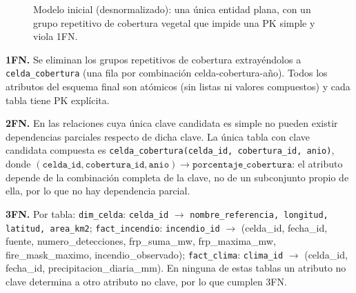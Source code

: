 \documentclass[11pt,a4paper]{article}
\begin{document}
\begin{figure}[H]
\centering
{}
\caption{Modelo inicial (desnormalizado): una \'unica entidad plana, con un grupo repetitivo de
cobertura vegetal que impide una PK simple y viola 1FN.}
\label{fig:modelo-inicial}
\end{figure}

\textbf{1FN.} Se eliminan los grupos repetitivos de cobertura extray\'endolos a
\texttt{celda\_cobertura} (una fila por combinaci\'on celda-cobertura-a\~no). Todos los atributos
del esquema final son at\'omicos (sin listas ni valores compuestos) y cada tabla tiene PK
expl\'icita.

\textbf{2FN.} En las relaciones cuya \'unica clave candidata es simple no pueden existir
dependencias parciales respecto de dicha clave. La \'unica tabla con clave candidata compuesta es
\texttt{celda\_cobertura(celda\_id, cobertura\_id, anio)}, donde
$(\texttt{celda\_id}, \texttt{cobertura\_id}, \texttt{anio}) \rightarrow
\texttt{porcentaje\_cobertura}$: el atributo depende de la combinaci\'on completa de la clave, no
de un subconjunto propio de ella, por lo que no hay dependencia parcial.

\textbf{3FN.} Por tabla: \texttt{dim\_celda}: \texttt{celda\_id} $\rightarrow$
\texttt{nombre\_referencia, longitud, latitud, area\_km2}; \texttt{fact\_incendio}:
\texttt{incendio\_id} $\rightarrow$ (celda\_id, fecha\_id, fuente, numero\_detecciones,
frp\_suma\_mw, frp\_maxima\_mw, fire\_mask\_maximo, incendio\_observado); \texttt{fact\_clima}:
\texttt{clima\_id} $\rightarrow$ (celda\_id, fecha\_id, precipitacion\_diaria\_mm). En ninguna de
estas tablas un atributo no clave determina a otro atributo no clave, por lo que cumplen 3FN.
\end{document}
